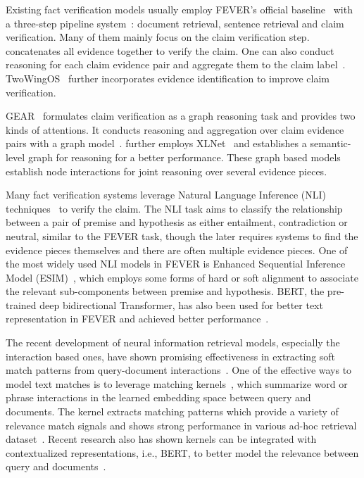 \documentclass[11pt,a4paper]{article}
\begin{document}
Existing fact verification models usually employ FEVER's official baseline~\cite{thorne2018fever} with a three-step pipeline system~\cite{chen2017reading}: document retrieval, sentence retrieval and claim verification. Many of them mainly focus on the claim verification step.
\citet{nie2019combining} concatenates all evidence together to verify the claim. 
One can also conduct reasoning for each claim evidence pair and aggregate them to the claim label~\cite{luken2018qed,yoneda2018ucl,hanselowski2018ukp}. TwoWingOS~\cite{yin2018twowingos} further incorporates evidence identification to improve claim verification.


GEAR~\cite{zhou2019gear} formulates claim verification as a graph reasoning task and provides two kinds of attentions. It conducts reasoning and aggregation over claim evidence pairs with a graph model~\cite{velivckovic2017graph, scarselli2008graph, kipf2016semi}. \citet{zhong2019reasoning} further employs XLNet~\cite{yang2019xlnet} and establishes a semantic-level graph for reasoning for a better performance. These graph based models establish node interactions for joint reasoning over several evidence pieces.

Many fact verification systems leverage Natural Language Inference (NLI) techniques~\cite{chen2017enhanced,ghaeini2018dr,parikh2016decomposable,radford2018improving,peters2018deep,li2019several} to verify the claim. The NLI task aims to classify the relationship between a pair of premise and hypothesis as either entailment, contradiction or neutral, similar to the FEVER task, though the later requires systems to find the evidence pieces themselves and there are often multiple evidence pieces.
One of the most widely used NLI models in FEVER is Enhanced Sequential Inference Model (ESIM)~\cite{chen2017enhanced}, which employs some forms of hard or soft alignment to associate the relevant sub-components between premise and hypothesis. 
BERT, the pre-trained deep bidirectional Transformer, has also been used for better text representation in FEVER and achieved better performance~\cite{devlin2019bert,li2019several,zhou2019gear,soleimani2019bert}.


The recent development of neural information retrieval models, especially the interaction based ones, have shown promising effectiveness in extracting soft match patterns from query-document interactions~\cite{arcii, Pang2016TextMA, jiafeng2016deep, xiong2017knrm, convknrm}.
One of the effective ways to model text matches is to leverage matching kernels~\cite{xiong2017knrm, convknrm}, which summarize word or phrase interactions in the learned embedding space between query and documents. The kernel extracts matching patterns which provide a variety of relevance match signals and shows strong performance in various ad-hoc retrieval dataset~\cite{dai2019deeper}. Recent research also has shown kernels can be integrated with contextualized representations, i.e., BERT, to better model the relevance between query and documents~\cite{macavaney2019cedr}.
\end{document}
